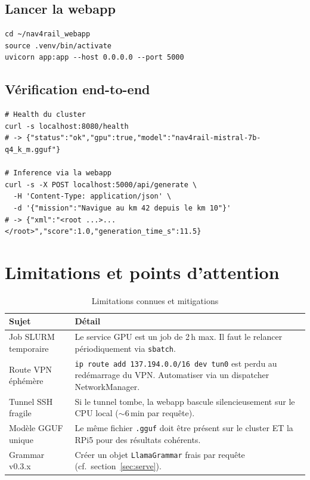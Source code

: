 \documentclass[a4paper,11pt]{article}
\begin{document}
\subsection{Lancer la webapp}

\begin{lstlisting}[style=bash]
cd ~/nav4rail_webapp
source .venv/bin/activate
uvicorn app:app --host 0.0.0.0 --port 5000
\end{lstlisting}

\subsection{Vérification end-to-end}

\begin{lstlisting}[style=bash, caption={Tests de bout en bout}]
# Health du cluster
curl -s localhost:8080/health
# -> {"status":"ok","gpu":true,"model":"nav4rail-mistral-7b-q4_k_m.gguf"}

# Inference via la webapp
curl -s -X POST localhost:5000/api/generate \
  -H 'Content-Type: application/json' \
  -d '{"mission":"Navigue au km 42 depuis le km 10"}'
# -> {"xml":"<root ...>...</root>","score":1.0,"generation_time_s":11.5}
\end{lstlisting}

\section{Limitations et points d'attention}
\label{sec:limitations}

\begin{table}[H]
\centering
\caption{Limitations connues et mitigations}
\label{tab:limitations}
\begin{tabularx}{\textwidth}{@{}l X@{}}
\toprule
\textbf{Sujet} & \textbf{Détail} \\
\midrule
Job SLURM temporaire &
    Le service GPU est un job de 2\,h max. Il faut le relancer
    périodiquement via \texttt{sbatch}. \\
Route VPN éphémère &
    \texttt{ip route add 137.194.0.0/16 dev tun0} est perdu au
    redémarrage du VPN. Automatiser via un dispatcher NetworkManager. \\
Tunnel SSH fragile &
    Si le tunnel tombe, la webapp bascule silencieusement sur le CPU
    local ($\sim$6\,min par requête). \\
Modèle GGUF unique &
    Le même fichier \texttt{.gguf} doit être présent sur le cluster ET
    la RPi5 pour des résultats cohérents. \\
Grammar v0.3.x &
    Créer un objet \texttt{LlamaGrammar} frais par requête (cf.\
    section~\ref{sec:serve}). \\
\bottomrule
\end{tabularx}
\end{table}
\end{document}
